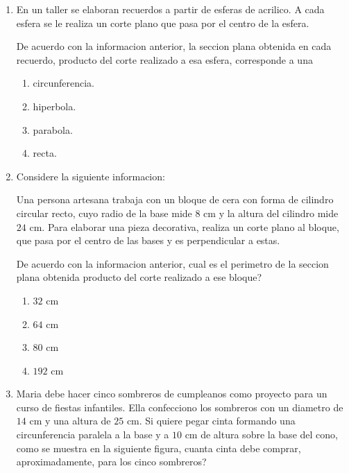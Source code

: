 \documentclass[12pt]{article}
\begin{document}
\begin{enumerate}[label=\textbf{\arabic*.}, itemsep=1.05cm]

\Needspace{0.42\textheight}
\item
En un taller se elaboran recuerdos a partir de esferas de acrilico. A cada esfera se le realiza un corte plano que pasa por el centro de la esfera.

De acuerdo con la informacion anterior, la seccion plana obtenida en cada recuerdo, producto del corte realizado a esa esfera, corresponde a una

\begin{enumerate}[label=\Alph*)]
  \item circunferencia.
  \item hiperbola.
  \item parabola.
  \item recta.
\end{enumerate}

\Needspace{0.48\textheight}
\item
Considere la siguiente informacion:

Una persona artesana trabaja con un bloque de cera con forma de cilindro circular recto, cuyo radio de la base mide $8$ cm y la altura del cilindro mide $24$ cm. Para elaborar una pieza decorativa, realiza un corte plano al bloque, que pasa por el centro de las bases y es perpendicular a estas.

De acuerdo con la informacion anterior, \textquestiondown cual es el perimetro de la seccion plana obtenida producto del corte realizado a ese bloque?

\begin{enumerate}[label=\Alph*)]
  \item $32$ cm
  \item $64$ cm
  \item $80$ cm
  \item $192$ cm
\end{enumerate}

\Needspace{0.78\textheight}
\item
Maria debe hacer cinco sombreros de cumpleanos como proyecto para un curso de fiestas infantiles. Ella confecciono los sombreros con un diametro de $14$ cm y una altura de $25$ cm. Si quiere pegar cinta formando una circunferencia paralela a la base y a $10$ cm de altura sobre la base del cono, como se muestra en la siguiente figura, \textquestiondown cuanta cinta debe comprar, aproximadamente, para los cinco sombreros?


\end{enumerate}
\end{document}
